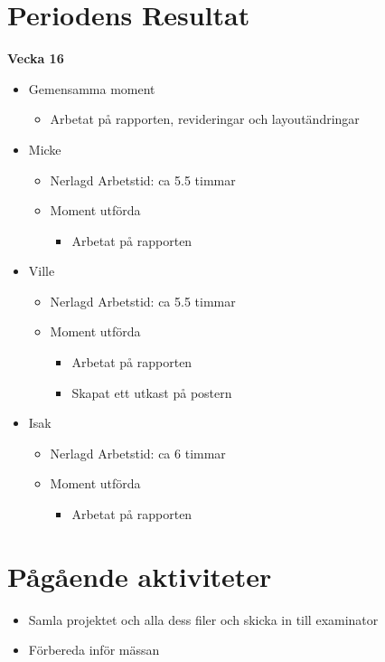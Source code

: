 \section{Periodens Resultat}
\textbf{\LARGE Vecka 16}
\begin{itemize}
\item Gemensamma moment
\begin{itemize}
\item Arbetat på rapporten, revideringar och layoutändringar
\end{itemize}
\item Micke
\begin{itemize}
\item Nerlagd Arbetstid: ca 5.5 timmar
\item Moment utförda
\begin{itemize}
\item Arbetat på rapporten
\end{itemize}
\end{itemize}

\item Ville
\begin{itemize}
\item Nerlagd Arbetstid: ca 5.5 timmar
\item Moment utförda
\begin{itemize}
\item Arbetat på rapporten
\item Skapat ett utkast på postern
\end{itemize}
\end{itemize}

\item Isak
\begin{itemize}
\item Nerlagd Arbetstid: ca 6 timmar
\item Moment utförda
\begin{itemize}
\item Arbetat på rapporten
\end{itemize}
\end{itemize}

\end{itemize}



\section{Pågående aktiviteter}
\begin{itemize}
\item Samla projektet och alla dess filer och skicka in till examinator
\item Förbereda inför mässan
\end{itemize}
